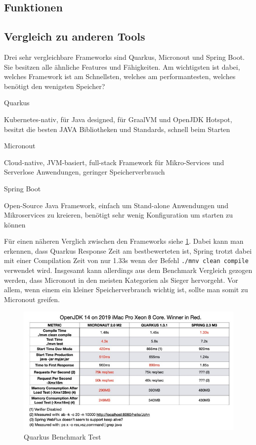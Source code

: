 \subsection{Funktionen}
\subsection{Vergleich zu anderen Tools}
Drei sehr vergleichbare Frameworks sind Quarkus, Micronout und Spring Boot. Sie besitzen alle ähnliche Features und Fähigkeiten. 
Am wichtigsten ist dabei, welches Framework ist am Schnellsten, welches am performantesten, welches benötigt den wenigsten Speicher?


\begin{compactitem}
    \item[Quarkus]
    \item Kubernetes-nativ, für Java designed, für GraalVM und OpenJDK Hotspot, besitzt die besten JAVA Bibliotheken und Standards, schnell beim Starten
    \item[Micronout]
    \item Cloud-native, JVM-basiert, full-stack Framework für Mikro-Services und Serverlose Anwendungen, geringer Speicherverbrauch
    \item[Spring Boot]
    \item Open-Source Java Framework, einfach um Stand-alone Anwendungen und Mikroservices zu kreieren, benötigt sehr wenig Konfiguration um starten zu können
\end{compactitem}

Für einen näheren Verglich zwischen den Frameworks siehe \ref{fig:impl:Quarkusbenchmark}. Dabei kann man erkennen, dass Quarkus Response Zeit am bestbewerteten ist, Spring trotzt dabei mit einer Compilation Zeit von nur 1.33s wenn der Befehl \texttt{./mnv clean compile} verwendet wird. Insgesamt kann allerdings aus dem Benchmark Vergleich gezogen werden, dass Micronout in den meisten Kategorien als Sieger hervorgeht. Vor allem, wenn einem ein kleiner Speicherverbrauch wichtig ist, sollte man somit zu Micronout greifen. 

\begin{figure}
    \centering
    \includegraphics[scale=0.8]{pics/quarkus_benchmark.jpg}
    \caption{Quarkus Benchmark Test}
    \label{fig:impl:Quarkusbenchmark}
\end{figure}

